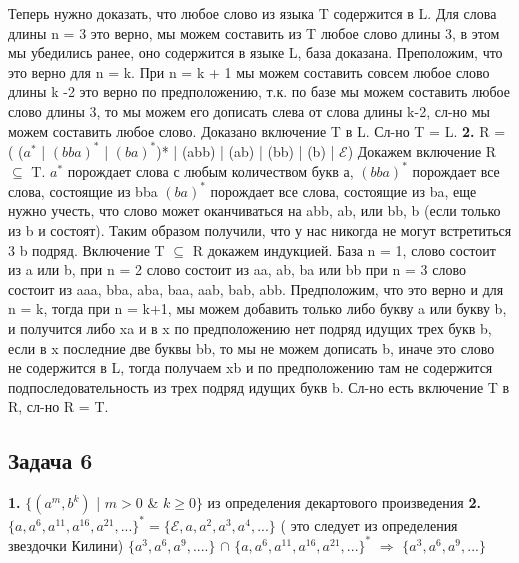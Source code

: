 \documentclass[a4paper,14pt]{article} %
\begin{document}
Теперь нужно доказать, что любое слово из языка T содержится в L. Для слова длины n = 3 это верно, мы можем составить из T любое слово длины 3, в этом мы убедились ранее, оно содержится в языке L, база доказана.
Преположим, что это верно для n = k. При n = k + 1 мы можем составить совсем любое слово длины k -2 это верно по предположению, т.к. по базе мы можем составить любое слово длины 3, то мы можем его дописать слева от слова длины k-2, сл-но мы можем составить любое слово. 
Доказано включение T в L.
Сл-но T = L.
\newline
\textbf{2.} R = ( ($a^{*}$ | $(bba)^{*}$ | $(ba)^{*}$)* | (abb) | (ab) | (bb) | (b) | $\mathcal{E}$)
\newline
Докажем включение R $\subseteq$ T.
\newline
$a^{*}$ порождает слова с любым количеством букв а,
$(bba)^{*}$ порождает все слова, состоящие из bba
$(ba)^{*}$ порождает все слова, состоящие из ba,
еще нужно учесть, что слово может оканчиваться на abb, ab, или bb, b (если только из b и состоят).
Таким образом получили, что у нас никогда не могут встретиться 3 b подряд.
\newline 
Включение T $\subseteq$ R докажем индукцией.
База n = 1, слово состоит из a или b, 
при n = 2 слово состоит из aa, ab, ba или bb
при n = 3 слово состоит из aaa, bba, aba, baa, aab, bab, abb.
Предположим, что это верно и для n = k, тогда при n = k+1, мы можем добавить только либо букву a или букву b, и получится либо xa и в x по предположению нет подряд идущих трех букв b,
если в x последние две буквы bb, то мы не можем дописать b, иначе это слово не содержится в L, тогда получаем xb и по предположению там не содержится подпоследовательность из трех подряд идущих букв b. Сл-но есть включение T в R, сл-но R = T.

\subsection{Задача 6}
\textbf{1.} $\{(a^{m}, b^{k})$ | $m > 0$ \& $k \geq 0 \}$ из определения декартового произведения
\newline 
\textbf{2.} $\{a, a^6, a^{11}, a^{16}, a^{21}, ... \}^{*} = \{\mathcal{E}, a, a^2, a^3, a^4, ...\}$ 
( это следует из определения звездочки Килини)
\newline
$\{a^3, a^6, a^9, .... \}$ 
$\cap$  
$\{a, a^6, a^{11}, a^{16}, a^{21}, ... \}^{*}$ 
$\Longrightarrow$ $\{a^3, a^6, a^9, ...\}$
\end{document}
